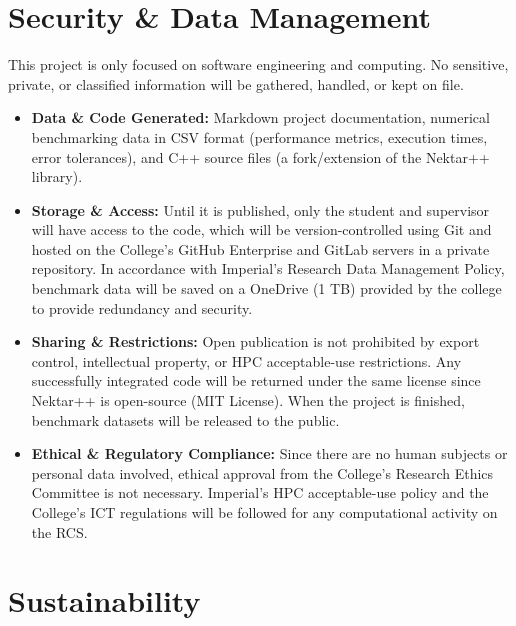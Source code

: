 \documentclass[10pt, a4paper]{article}
\begin{document}
\section*{Security \& Data Management}

This project is only focused on software engineering and computing. No sensitive, private, or classified information will be gathered, handled, or kept on file.
\begin{itemize}[leftmargin=*, label={\color{ImperialBlue}\textbullet}, nosep, topsep=0pt]
    \item \textbf{Data \& Code Generated:} Markdown project documentation, numerical benchmarking data in CSV format (performance metrics, execution times, error tolerances), and C++ source files (a fork/extension of the Nektar++ library).
    \item \textbf{Storage \& Access:} Until it is published, only the student and supervisor will have access to the code, which will be version-controlled using Git and hosted on the College's GitHub Enterprise and GitLab servers in a private repository.  In accordance with Imperial's Research Data Management Policy, benchmark data will be saved on a OneDrive (1 TB) provided by the college to provide redundancy and security.
    \item \textbf{Sharing \& Restrictions:} Open publication is not prohibited by export control, intellectual property, or HPC acceptable-use restrictions.  Any successfully integrated code will be returned under the same license since Nektar++ is open-source (MIT License). When the project is finished, benchmark datasets will be released to the public.
    \item \textbf{Ethical \& Regulatory Compliance:} Since there are no human subjects or personal data involved, ethical approval from the College's Research Ethics Committee is not necessary.  Imperial's HPC acceptable-use policy and the College's ICT regulations will be followed for any computational activity on the RCS.
\end{itemize}

\section*{Sustainability}
\end{document}
